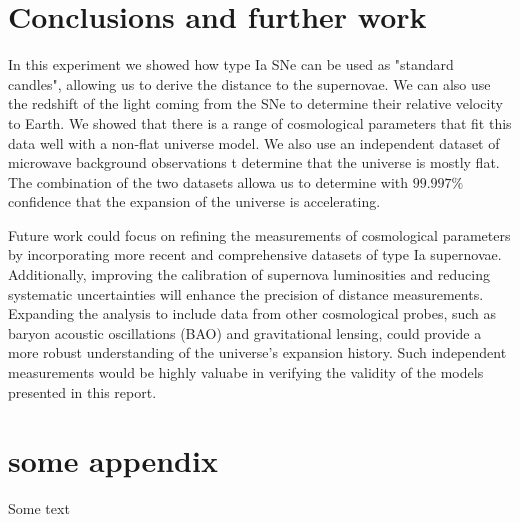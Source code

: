 \documentclass[11pt]{article}
\begin{document}
\section{Conclusions and further work}
In this experiment we showed how type Ia SNe can be used as "standard candles", allowing us to derive the distance to the supernovae. We can also use the redshift of the light coming from the SNe to determine their relative velocity to Earth. We showed that there is a range of cosmological parameters that fit this data well with a non-flat universe model. We also use an independent dataset of microwave background observations t determine that the universe is mostly flat. The combination of the two datasets allowa us to determine with $99.997\%$ confidence that the expansion of the universe is accelerating. 

Future work could focus on refining the measurements of cosmological parameters by incorporating more recent and comprehensive datasets of type Ia supernovae. Additionally, improving the calibration of supernova luminosities and reducing systematic uncertainties will enhance the precision of distance measurements. Expanding the analysis to include data from other cosmological probes, such as baryon acoustic oscillations (BAO) and gravitational lensing, could provide a more robust understanding of the universe's expansion history. Such independent measurements would be highly valuabe in verifying the validity of the models presented in this report. 




\newpage

\appendix
\section{some appendix} 
Some text
\end{document}
